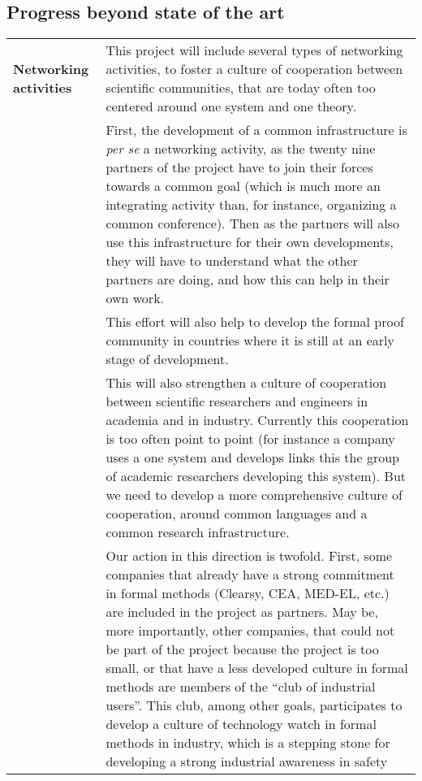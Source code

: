 \subsection*{Progress beyond state of the art}


\begin{longtable}{|p{}|p{}|}
\hline
{\bf Networking activities}
&
This project will include several types of networking activities, to
foster a culture of cooperation between scientific communities, that
are today often too centered around one system and one theory.\\
&
\hspace{0.4cm} First, the development of a common infrastructure is
\emph{per se} a networking activity, as the twenty nine partners of the
project have to join their forces towards a common goal (which is much
more an integrating activity than, for instance, organizing a common
conference). Then as the partners will also use this infrastructure
for their own developments, they will have to understand what the
other partners are doing, and how this can help in their own work.\\ &
\hspace{0.4cm}
This effort will also help to develop the formal proof community in
countries where it is still at an early stage of development.\\
&
\hspace{0.4cm}
This will also strengthen a culture of cooperation between scientific
researchers and engineers in academia and in industry. Currently this
cooperation is too often point to point (for instance a company uses a
one system and develops links this the group of academic researchers
developing this system). But we need to develop a more comprehensive
culture of cooperation, around common languages and a common research
infrastructure.\\
&
\hspace{0.4cm}
Our action in this direction is twofold. First, some companies that
already have a strong commitment in formal methods (Clearsy, CEA,
MED-EL, etc.) are included in the project as partners. May be, more
importantly, other companies, that could not be part of the project
because the project is too small, or that have a less developed
culture in formal methods are members of the ``club of industrial
users''. This club, among other goals, participates to develop a
culture of technology watch in formal methods in industry, which is a
stepping stone for developing a strong industrial awareness in safety

\end{longtable}
